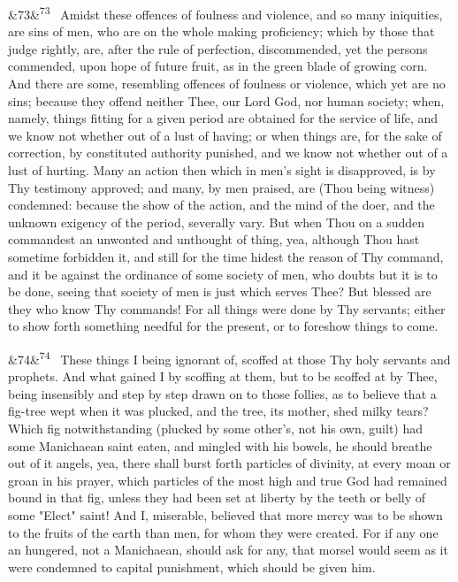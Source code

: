 \documentclass[12pt]{article}
\newcommand{\para}[1][]{\par\noindent\ifx&#1&\else\textsuperscript{\footnotesize #1}~\fi}
\begin{document}
\para[73] Amidst these offences of foulness and violence, and so many iniquities, are sins of men, who are on the whole making proficiency; which by those that judge rightly, are, after the rule of perfection, discommended, yet the persons commended, upon hope of future fruit, as in the green blade of growing corn. And there are some, resembling offences of foulness or violence, which yet are no sins; because they offend neither Thee, our Lord God, nor human society; when, namely, things fitting for a given period are obtained for the service of life, and we know not whether out of a lust of having; or when things are, for the sake of correction, by constituted authority punished, and we know not whether out of a lust of hurting. Many an action then which in men's sight is disapproved, is by Thy testimony approved; and many, by men praised, are (Thou being witness) condemned: because the show of the action, and the mind of the doer, and the unknown exigency of the period, severally vary. But when Thou on a sudden commandest an unwonted and unthought of thing, yea, although Thou hast sometime forbidden it, and still for the time hidest the reason of Thy command, and it be against the ordinance of some society of men, who doubts but it is to be done, seeing that society of men is just which serves Thee? But blessed are they who know Thy commands! For all things were done by Thy servants; either to show forth something needful for the present, or to foreshow things to come.

\para[74] These things I being ignorant of, scoffed at those Thy holy servants and prophets. And what gained I by scoffing at them, but to be scoffed at by Thee, being insensibly and step by step drawn on to those follies, as to believe that a fig-tree wept when it was plucked, and the tree, its mother, shed milky tears? Which fig notwithstanding (plucked by some other's, not his own, guilt) had some Manichaean saint eaten, and mingled with his bowels, he should breathe out of it angels, yea, there shall burst forth particles of divinity, at every moan or groan in his prayer, which particles of the most high and true God had remained bound in that fig, unless they had been set at liberty by the teeth or belly of some "Elect" saint! And I, miserable, believed that more mercy was to be shown to the fruits of the earth than men, for whom they were created. For if any one an hungered, not a Manichaean, should ask for any, that morsel would seem as it were condemned to capital punishment, which should be given him.
\end{document}
